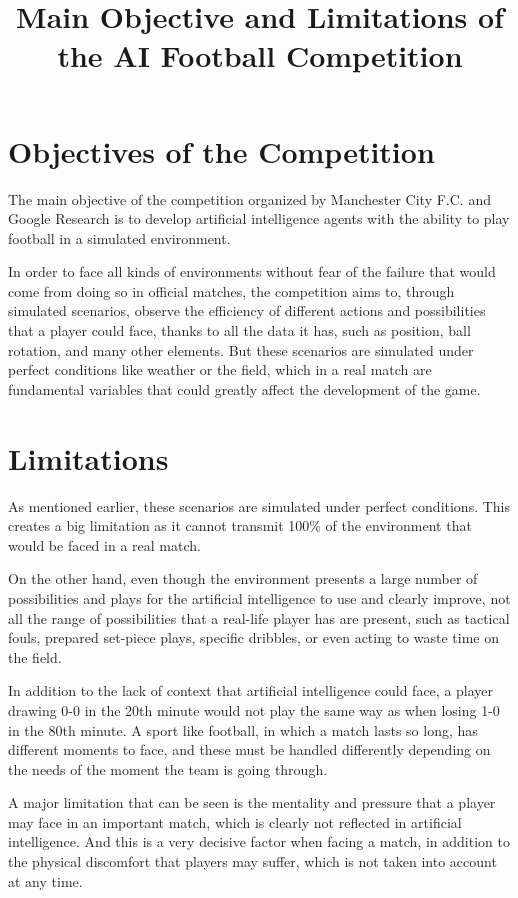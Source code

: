 \documentclass[12pt]{article}
\title{Main Objective and Limitations of the AI Football Competition}
\date{}
\begin{document}
\maketitle

\section*{Objectives of the Competition}

The main objective of the competition organized by Manchester City F.C. and Google Research is to develop artificial intelligence agents with the ability to play football in a simulated environment.

In order to face all kinds of environments without fear of the failure that would come from doing so in official matches, the competition aims to, through simulated scenarios, observe the efficiency of different actions and possibilities that a player could face, thanks to all the data it has, such as position, ball rotation, and many other elements. But these scenarios are simulated under perfect conditions like weather or the field, which in a real match are fundamental variables that could greatly affect the development of the game.

\section*{Limitations}

As mentioned earlier, these scenarios are simulated under perfect conditions. This creates a big limitation as it cannot transmit 100\% of the environment that would be faced in a real match.

On the other hand, even though the environment presents a large number of possibilities and plays for the artificial intelligence to use and clearly improve, not all the range of possibilities that a real-life player has are present, such as tactical fouls, prepared set-piece plays, specific dribbles, or even acting to waste time on the field.

In addition to the lack of context that artificial intelligence could face, a player drawing 0-0 in the 20th minute would not play the same way as when losing 1-0 in the 80th minute. A sport like football, in which a match lasts so long, has different moments to face, and these must be handled differently depending on the needs of the moment the team is going through.

A major limitation that can be seen is the mentality and pressure that a player may face in an important match, which is clearly not reflected in artificial intelligence. And this is a very decisive factor when facing a match, in addition to the physical discomfort that players may suffer, which is not taken into account at any time.
\end{document}
